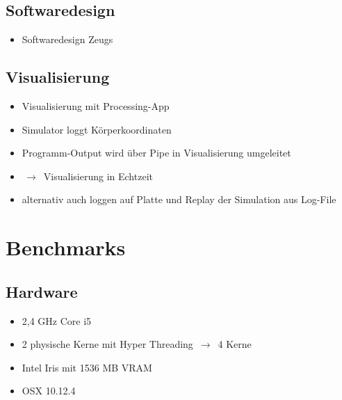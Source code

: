 \documentclass{beamer}
\begin{document}
\subsection{Softwaredesign}
\begin{frame}
\begin{itemize}
  \item Softwaredesign Zeugs
\end{itemize}
\end{frame}

\subsection{Visualisierung}
\begin{frame}
\begin{itemize}
  \item Visualisierung mit Processing-App
  \item Simulator loggt Körperkoordinaten
  \item Programm-Output wird über Pipe in Visualisierung umgeleitet
  \item $\,\to\,$ Visualisierung in Echtzeit
  \item alternativ auch loggen auf Platte und Replay der Simulation aus Log-File
\end{itemize}
\end{frame}

\section{Benchmarks}
\subsection{Hardware}
\begin{frame}
\begin{itemize}
  \item 2,4 GHz Core i5
  \item 2 physische Kerne mit Hyper Threading $\,\to\,$ 4 Kerne
  \item Intel Iris mit 1536 MB VRAM
  \item OSX 10.12.4
\end{itemize}
\end{frame}
\end{document}
